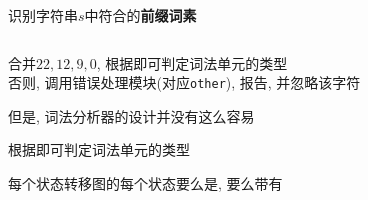 \begin{frame}{}
  \begin{center}
    识别字符串$s$中符合的{\bf 前缀词素} 
  \end{center}

  \begin{columns}
      \begin{center}
      \end{center}
      \begin{center}
      \end{center}
  \end{columns}

  \pause
  \vspace{0.30cm}
  \begin{center}
     合并$22, 12, 9, 0$, 根据即可判定词法单元的类型 \\[8pt]
    否则, 调用错误处理模块(对应\texttt{other}), 报告, 并忽略该字符
  \end{center}
\end{frame}

\begin{frame}{}
  \begin{center}
    但是, 词法分析器的设计并没有这么容易

    \vspace{0.50cm}
  \end{center}
\end{frame}

\begin{frame}{}
  \begin{center}
    \ws \quad \ifkw \quad \elsekw \quad \id \quad \intnum \quad \relop 
    
    \vspace{0.80cm}
    根据即可判定词法单元的类型

    \vspace{0.50cm}
    每个状态转移图的每个状态要么是, 要么带有

    \pause
    \vspace{1.20cm}
  \end{center}
\end{frame}

